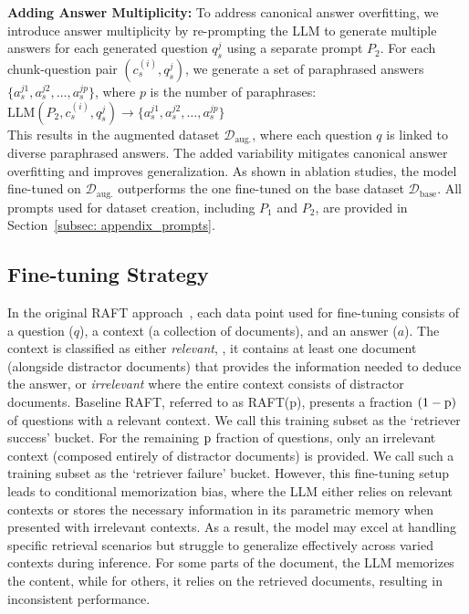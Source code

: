 \noindent\textbf{Adding Answer Multiplicity:} 
To address canonical answer overfitting, we introduce answer multiplicity by re-prompting the LLM to generate multiple answers for each generated question $q_s^j$ using a separate prompt $P_2$. For each chunk-question pair $(c^{(i)}_s, q_s^j)$, we generate a set of paraphrased answers $\{a_s^{j1}, a_s^{j2}, \dots, a_s^{jp}\}$, where $p$ is the number of paraphrases:\\
$
\mathrm{LLM}(P_2, c^{(i)}_s, q_s^j) \rightarrow \{a_s^{j1}, a_s^{j2}, \dots, a_s^{jp}\}
$ \\
This results in the augmented dataset $\mathcal{D}_{\text{aug.}}$, where each question $q$ is linked to diverse paraphrased answers. The added variability mitigates canonical answer overfitting and improves generalization. As shown in ablation studies, the model fine-tuned on $\mathcal{D}_{\text{aug.}}$ outperforms the one fine-tuned on the base dataset $\mathcal{D}_{\text{base}}$.
All prompts used for dataset creation, including $P_1$ and $P_2$, are provided in Section~\ref{subsec: appendix_prompts}.

\subsection{Fine-tuning Strategy} \label{subsec:fine_tuning_strategy}

In the original RAFT approach~\citep{zhang2024raft}, each data point used for fine-tuning consists of a question ($q$), a context (a collection of documents), and an answer ($a$). The context is classified as either \emph{relevant}, \ie, it contains at least one document (alongside distractor documents) that provides the information needed to deduce the answer, or \emph{irrelevant} where the entire context consists of distractor documents.
Baseline RAFT, referred to as RAFT($\mathrm{p}$), presents a fraction $(1-\mathrm{p})$ of questions with a relevant context. We call this training subset as the `retriever success' bucket.
For the remaining $\mathrm{p}$ fraction of questions, only an irrelevant context (composed entirely of distractor documents) is provided. We call such a training subset as the `retriever failure' bucket.
However, this fine-tuning setup leads to conditional memorization bias, where the LLM either relies on relevant contexts or stores the necessary information in its parametric memory when presented with irrelevant contexts. As a result, the model may excel at handling specific retrieval scenarios but struggle to generalize effectively across varied contexts during inference. For some parts of the document, the LLM memorizes the content, while for others, it relies on the retrieved documents, resulting in inconsistent performance.

